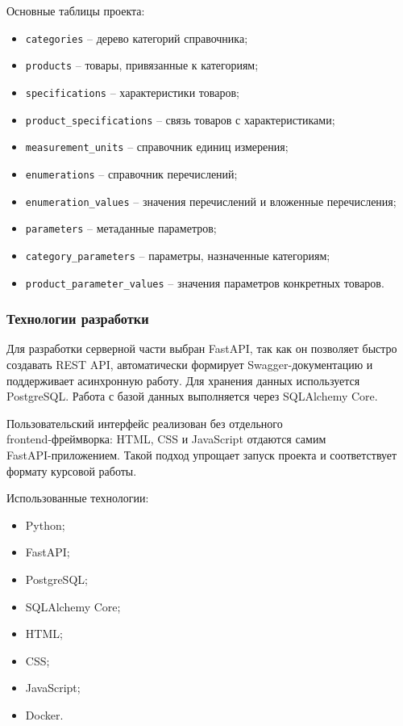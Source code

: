 \documentclass[a4paper,14pt]{extarticle}
\begin{document}
Основные таблицы проекта:
\begin{itemize}
    \item \texttt{categories} -- дерево категорий справочника;
    \item \texttt{products} -- товары, привязанные к категориям;
    \item \texttt{specifications} -- характеристики товаров;
    \item \texttt{product\_specifications} -- связь товаров с характеристиками;
    \item \texttt{measurement\_units} -- справочник единиц измерения;
    \item \texttt{enumerations} -- справочник перечислений;
    \item \texttt{enumeration\_values} -- значения перечислений и вложенные перечисления;
    \item \texttt{parameters} -- метаданные параметров;
    \item \texttt{category\_parameters} -- параметры, назначенные категориям;
    \item \texttt{product\_parameter\_values} -- значения параметров конкретных товаров.
\end{itemize}

\subsubsection{Технологии разработки}

Для разработки серверной части выбран FastAPI, так как он позволяет быстро создавать REST API, автоматически формирует Swagger-документацию и поддерживает асинхронную работу. Для хранения данных используется \\ PostgreSQL. Работа с базой данных выполняется через SQLAlchemy Core.

Пользовательский интерфейс реализован без отдельного \\ frontend-фреймворка: HTML, CSS и JavaScript отдаются самим \\ FastAPI-приложением. Такой подход упрощает запуск проекта и соответствует формату курсовой работы.

Использованные технологии:
\begin{itemize}
    \item Python;
    \item FastAPI;
    \item PostgreSQL;
    \item SQLAlchemy Core;
    \item HTML;
    \item CSS;
    \item JavaScript;
    \item Docker.
\end{itemize}
\end{document}

